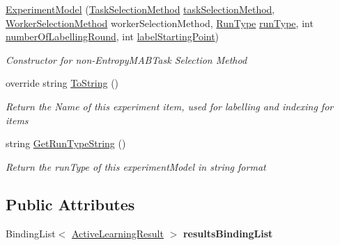 \begin{DoxyCompactItemize}
\item 
\hyperlink{class_acrive_crowd_g_u_i_1_1_experiment_model_a6a123911e50acef2040b3769458e8e9c}{Experiment\+Model} (\hyperlink{namespace_crowdsourcing_models_a1bb21d66b6c86daa36af97d919528356}{Task\+Selection\+Method} \hyperlink{class_acrive_crowd_g_u_i_1_1_experiment_model_adc798915e34d2b0cf58e527db9372300}{task\+Selection\+Method}, \hyperlink{namespace_crowdsourcing_models_a1f0e849dc0691caa8fda0ce7778756a6}{Worker\+Selection\+Method} worker\+Selection\+Method, \hyperlink{namespace_crowdsourcing_models_ae187d0e1d9fe64e7ebcb9d948d02d2d0}{Run\+Type} \hyperlink{class_acrive_crowd_g_u_i_1_1_experiment_model_a1f9de8a43c8836d01bb6a0d643677627}{run\+Type}, int \hyperlink{class_acrive_crowd_g_u_i_1_1_experiment_model_ad35017c811ab03b6a31d7cd467badcef}{number\+Of\+Labelling\+Round}, int \hyperlink{class_acrive_crowd_g_u_i_1_1_experiment_model_a3aa0a6773b8ecfb0aca8bb08e57b02ed}{label\+Starting\+Point})
\begin{DoxyCompactList}\small\item\em Constructor for non-\/\+Entropy\+M\+A\+B\+Task Selection Method \end{DoxyCompactList}\item 
override string \hyperlink{class_acrive_crowd_g_u_i_1_1_experiment_model_a60ce0ab356fa86d66e7d38ad56fe65ab}{To\+String} ()
\begin{DoxyCompactList}\small\item\em Return the Name of this experiment item, used for labelling and indexing for items \end{DoxyCompactList}\item 
string \hyperlink{class_acrive_crowd_g_u_i_1_1_experiment_model_aca475fb9c01b05c0428a63b2df7e4101}{Get\+Run\+Type\+String} ()
\begin{DoxyCompactList}\small\item\em Return the run\+Type of this experiment\+Model in string format \end{DoxyCompactList}\end{DoxyCompactItemize}
\subsection*{Public Attributes}
\begin{DoxyCompactItemize}
\item 
\hypertarget{class_acrive_crowd_g_u_i_1_1_experiment_model_abef764896523cc0138b576bc7170aaae}{}Binding\+List$<$ \hyperlink{class_crowdsourcing_models_1_1_active_learning_result}{Active\+Learning\+Result} $>$ {\bfseries results\+Binding\+List}\label{class_acrive_crowd_g_u_i_1_1_experiment_model_abef764896523cc0138b576bc7170aaae}

\end{DoxyCompactItemize}

